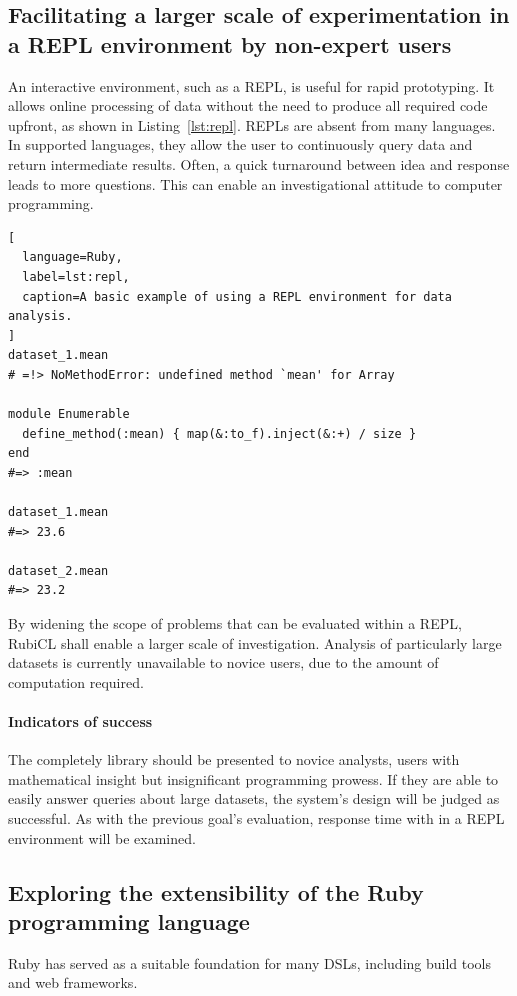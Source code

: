 \subsection{Facilitating a larger scale of experimentation in a REPL environment by non-expert users}

An interactive environment, such as a \ac{REPL}, is useful for rapid prototyping. It allows online processing of data without the need to produce all required code upfront, as shown in Listing~\ref{lst:repl}. \acp{REPL} are absent from many languages. In supported languages, they allow the user to continuously query data and return intermediate results. Often, a quick turnaround between idea and response leads to more questions. This can enable an investigational attitude to computer programming.

\begin{lstlisting}[
  language=Ruby,
  label=lst:repl,
  caption=A basic example of using a REPL environment for data analysis.
]
dataset_1.mean
# =!> NoMethodError: undefined method `mean' for Array

module Enumerable
  define_method(:mean) { map(&:to_f).inject(&:+) / size }
end
#=> :mean

dataset_1.mean
#=> 23.6

dataset_2.mean
#=> 23.2
\end{lstlisting}

By widening the scope of problems that can be evaluated within a \ac{REPL}, RubiCL shall enable a larger scale of investigation. Analysis of particularly large datasets is currently unavailable to novice users, due to the amount of computation required.

\paragraph*{Indicators of success}
The completely library should be presented to novice analysts, users with mathematical insight but insignificant programming prowess. If they are able to easily answer queries about large datasets, the system's design will be judged as successful. As with the previous goal's evaluation, response time with in a \ac{REPL} environment will be examined.

\subsection{Exploring the extensibility of the Ruby programming language}
Ruby has served as a suitable foundation for many \acp{DSL}, including build tools\cite{rake} and web frameworks\cite{sinatra}.

